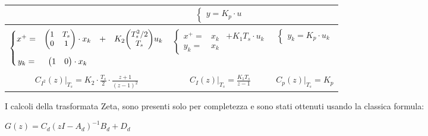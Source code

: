 \begin{table}[H]
{\begin{tabular}[t]{||c||c||c||}
			                                                                          &
			$\left\{\begin{matrix}
					y = K_p \cdot u
				\end{matrix}\right. $                                                                                                   \\[9mm]
			\hline\hline
			                                                                          &                                        &                         \\[-3mm]
			{\normalsize $ \left\{\begin{matrix}
					x^+ = & {\small \begin{pmatrix}
								1 & T_s \\
								0 & 1
							\end{pmatrix}} \cdot x_k & + & K_2 {\small \begin{pmatrix}
						T_s^2/2 \\
						T_s
					\end{pmatrix}} u_k \\
					      &                                                                                                \\[-1mm]
					y_k = & \begin{pmatrix}
						1 & 0
					\end{pmatrix} \cdot x_k
				\end{matrix}\right. $
			}                                                                         & {\normalsize
					$ \left\{\begin{matrix}
							x^+ = & x_k & + K_1 T_s \cdot u_k \\
							y_k = & x_k
						\end{matrix}\right.$

			}                                                                         &
			$\left\{\begin{matrix}
					y_k        = K_p \cdot u_k
				\end{matrix}\right. $                                                                                                  \\[9mm]

			                                                                          &                                        &                         \\[-3mm]
			$ C_{I^2}(z)|_{T_s} = K_2 \cdot \frac{T_s}{2} \cdot \frac{z+1}{(z -1)^2}$ & $ C_I(z)|_{T_s} = \frac{K_1 T_s}{z-1}$ & $ C_p(z)|_{T_s} = K_p $ \\[2mm]
			\hline
		\end{tabular}}
\end{table}
\noindent
I calcoli della trasformata Zeta, sono presenti solo per completezza e sono stati ottenuti usando la classica formula:
{\large \begin{center}
	$ G(z) = C_d \left(z I - A_d\right)^{-1} B_d + D_d $
\end{center}
}

